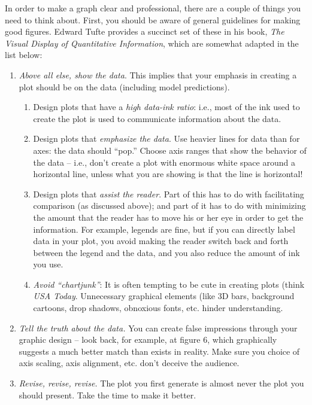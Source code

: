 \documentclass{tufte-handout}
\begin{document}
In order to make a graph clear and professional, there are a couple of things you need to think about.  First, you should be aware of general guidelines for making good figures.  Edward Tufte provides a succinct set of these in his book, {\it The Visual Display of Quantitative Information}, which are somewhat adapted in the list below:
\begin{enumerate}
\item {\em Above all else, show the data}.  This implies that your emphasis in creating a plot should be on the data (including model predictions).  
\begin{enumerate}
\item Design plots that have a {\em high data-ink ratio}:  i.e., most of the ink used to create the plot is used to communicate information about the data.  
\item Design plots that {\em emphasize the data}.  Use heavier lines for data than for axes: the data should ``pop.''  Choose axis ranges that show the behavior of the data -- i.e., don't create a plot with enormous white space around a horizontal line, unless what you are showing is that the line is horizontal!  
\item Design plots that {\em assist the reader}.  Part of this has to do with facilitating comparison (as discussed above); and part of it has to do with minimizing the amount that the reader has to move his or her eye in order to get the information.  For example, legends are fine, but if you can directly label data in your plot, you avoid making the reader switch back and forth between the legend and the data, and you also reduce the amount of ink you use.
\item {\em Avoid ``chartjunk''}: It is often tempting to be cute in creating plots (think {\it USA Today}.  Unnecessary graphical elements (like 3D bars, background cartoons, drop shadows, obnoxious fonts, etc. hinder understanding. 
\end{enumerate}
\item {\em Tell the truth about the data.} You can create false impressions through your graphic design -- look back, for example, at figure 6, which graphically suggests a much better match than exists in reality.  Make sure you choice of axis scaling, axis alignment, etc. don't deceive the audience.
\item {\em Revise, revise, revise.}  The plot you first generate is almost never the plot you should present.  Take the time to make it better.
\end{enumerate}
\end{document}

